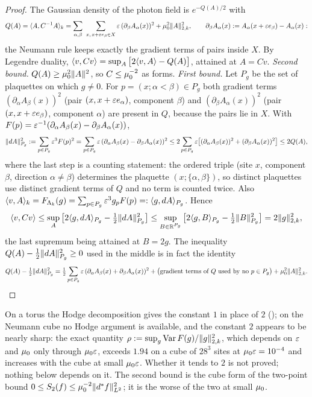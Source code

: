 \begin{proof}
The Gaussian density of the photon field is $e^{-Q(A)/2}$ with
\[
Q(A)=\langle A,C^{-1}A\rangle_k=\sum_{\alpha,\beta}\ \sum_{x,\,x+\varepsilon e_\beta\in X}\varepsilon\,(\partial_\beta A_\alpha(x))^2+\mu_0^2\lVert A\rVert_{2,k}^2,\qquad \partial_\beta A_\alpha(x):= A_\alpha(x+\varepsilon e_\beta)-A_\alpha(x):
\]
the Neumann rule keeps exactly the gradient terms of pairs inside $X$. By Legendre duality, $\langle v,Cv\rangle=\sup_A\big[2\langle v,A\rangle-Q(A)\big]$, attained at $A=Cv$. \emph{Second bound.} $Q(A)\ge\mu_0^2\lVert A\rVert^2$, so $C\le\mu_0^{-2}$ as forms. \emph{First bound.} Let $P_g$ be the set of plaquettes on which $g\ne0$. For $p=(x;\alpha<\beta)\in P_g$ both gradient terms $(\partial_\alpha A_\beta(x))^2$ (pair $(x,x+\varepsilon e_\alpha)$, component $\beta$) and $(\partial_\beta A_\alpha(x))^2$ (pair $(x,x+\varepsilon e_\beta)$, component $\alpha$) are present in $Q$, because the pairs lie in $X$. With $F(p)=\varepsilon^{-1}(\partial_\alpha A_\beta(x)-\partial_\beta A_\alpha(x))$,
\[
\lVert dA\rVert^2_{P_g}:=\sum_{p\in P_g}\varepsilon^3F(p)^2=\sum_{p\in P_g}\varepsilon\,(\partial_\alpha A_\beta(x)-\partial_\beta A_\alpha(x))^2\le2\sum_{p\in P_g}\varepsilon\big[(\partial_\alpha A_\beta(x))^2+(\partial_\beta A_\alpha(x))^2\big]\le2Q(A),
\]
where the last step is a counting statement: the ordered triple (site $x$, component $\beta$, direction $\alpha\ne\beta$) determines the plaquette $(x;\{\alpha,\beta\})$, so distinct plaquettes use distinct gradient terms of $Q$ and no term is counted twice. Also $\langle v,A\rangle_k=F_{\Lambda_k}(g)=\sum_{p\in P_g}\varepsilon^3g_pF(p)=:\langle g,dA\rangle_{P_g}$. Hence
\[
\langle v,Cv\rangle\le\sup_A\big[2\langle g,dA\rangle_{P_g}-\tfrac12\lVert dA\rVert^2_{P_g}\big]\le\sup_{B\in\mathbb R^{P_g}}\big[2\langle g,B\rangle_{P_g}-\tfrac12\lVert B\rVert^2_{P_g}\big]=2\lVert g\rVert_{2,k}^2,
\]
the last supremum being attained at $B=2g$. The inequality $Q(A)-\frac12\lVert dA\rVert^2_{P_g}\ge0$ used in the middle is in fact the identity
\[
Q(A)-\tfrac12\lVert dA\rVert^2_{P_g}=\tfrac12\sum_{p\in P_g}\varepsilon\,(\partial_\alpha A_\beta(x)+\partial_\beta A_\alpha(x))^2+\big(\text{gradient terms of $Q$ used by no $p\in P_g$}\big)+\mu_0^2\lVert A\rVert^2_{2,k}.\qedhere
\]
\end{proof}

\begin{remark}\label{rem:s05:sharp}
On a torus the Hodge decomposition gives the constant $1$ in place of $2$ (\cite[lem:C-Fsector]{SymPhase}); on the Neumann cube no Hodge argument is available, and the constant $2$ appears to be nearly sharp: the exact quantity $\rho:=\sup_g\operatorname{Var} F(g)/\lVert g\rVert^2_{2,k}$, which depends on $\varepsilon$ and $\mu_0$ only through $\mu_0\varepsilon$, exceeds $1.94$ on a cube of $28^3$ sites at $\mu_0\varepsilon=10^{-4}$ and increases with the cube at small $\mu_0\varepsilon$. Whether it tends to $2$ is not proved; nothing below depends on it. The second bound is the cube form of the two-point bound $0\le S_2(f)\le\mu_0^{-2}\lVert d^{*} f\rVert^2_{L^2}$; it is the worse of the two at small $\mu_0$.
\end{remark}


